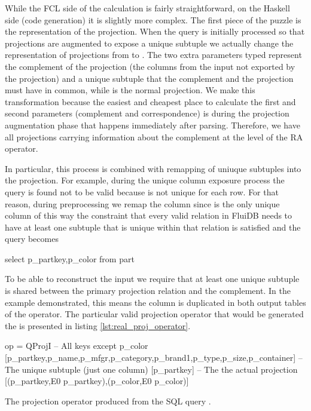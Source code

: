 While the FCL side of the calculation is fairly straightforward, on
the Haskell side (code generation) it is slightly more complex. The
first piece of the puzzle is the representation of the
projection. When the query is initially processed so that projections
are augmented to expose a unique subtuple we actually change the
representation of projections from  to
. The two extra parameters typed
\hask{[e]} represent the complement of the projection (the columns
from the input not exported by the projection) and a unique subtuple
that the complement and the projection must have in common, while
\hask{[(e,Expr e)]} is the normal projection. We make this
transformation because the easiest and cheapest place to calculate the
first and second parameters (complement and correspondence) is during
the projection augmentation phase that happens immediately after
parsing. Therefore, we have all projections carrying information about the
complement at the level of the RA operator.

In particular, this process is combined with remapping of uniuque
subtuples into the projection. For example, during the unique column
exposure process the query  is found not
to be valid because  is not unique for each row. For that
reason, during preprocessing we remap the  column since
 is the only unique column of  this way the
constraint that every valid relation in FluiDB needs to have at least
one subtuple that is unique within that relation is satisfied and the
query becomes

\begin{sqlcode}
select p_partkey,p_color from part
\end{sqlcode}

To be able to reconstruct the input we require that at least
one unique subtuple is shared between the primary projection relation
and the complement. In the example demonstrated, this means the
 column is duplicated in both output tables of the
operator. The particular valid projection operator that would be
generated the  is presented in listing
\ref{lst:real_proj_operator}.

\begin{code}
\begin{haskellcode}
op =
  QProjI
    -- All keys except p_color
    [p_partkey,p_name,p_mfgr,p_category,p_brand1,p_type,p_size,p_container]
    -- The unique subtuple (just one column)
    [p_partkey]
    -- The the actual projection
    [(p_partkey,E0 p_partkey),(p_color,E0 p_color)]
\end{haskellcode}
  \caption{\label{lst:real_proj_operator}The projection operator
    produced from the SQL query .}
\end{code}

